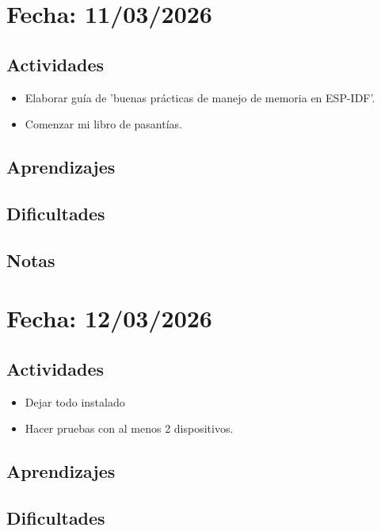 \documentclass[12pt, a4paper]{article}
\begin{document}
    \section*{Fecha: 11/03/2026}

    \subsection*{Actividades}

    \begin{itemize}
        \item Elaborar guía de 'buenas prácticas de manejo de memoria en ESP-IDF'.
        \item Comenzar mi libro de pasantías.
    \end{itemize}

    \subsection*{Aprendizajes}

    \subsection*{Dificultades}

    \subsection*{Notas}

    \section*{Fecha: 12/03/2026}

    \subsection*{Actividades}

    \begin{itemize}
        \item Dejar todo instalado
        \item Hacer pruebas con al menos 2 dispositivos.
    \end{itemize}

    \subsection*{Aprendizajes}

    \subsection*{Dificultades}
\end{document}
